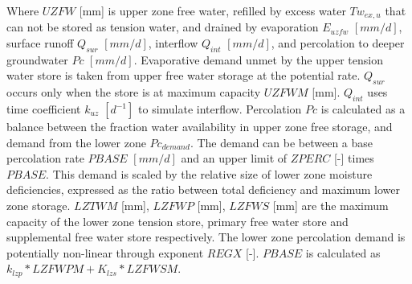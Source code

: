 Where $UZFW$ [mm] is upper zone free water, refilled by excess water $Tw_{ex,u}$ that can not be stored as tension water, and drained by evaporation  $E_{uzfw}$ $[mm/d]$, surface runoff $Q_{sur}$ $[mm/d]$, interflow $Q_{int}$ $[mm/d]$, and percolation to deeper groundwater $Pc$ $[mm/d]$.
Evaporative demand unmet by the upper tension water store is taken from upper free water storage at the potential rate.
$Q_{sur}$ occurs only when the store is at maximum capacity $UZFWM$ [mm].
$Q_{int}$ uses time coefficient $k_{uz}$ $[d^{-1}]$ to simulate interflow.
Percolation $Pc$ is calculated as a balance between the fraction water availability in upper zone free storage, and demand from the lower zone $Pc_{demand}$. The demand can be between a base percolation rate $PBASE$ $[mm/d]$ and an upper limit of $ZPERC$ [-] times $PBASE$. This demand is scaled by the relative size of lower zone moisture deficiencies, expressed as the ratio between total deficiency and maximum lower zone storage. $LZTWM$ [mm], $LZFWP$ [mm], $LZFWS$ [mm] are the maximum capacity of the lower zone tension store, primary free water store and supplemental free water store respectively. The lower zone percolation demand is potentially non-linear through exponent $REGX$ [-]. $PBASE$ is calculated as $k_{lzp}*LZFWPM+K_{lzs}*LZFWSM$.

